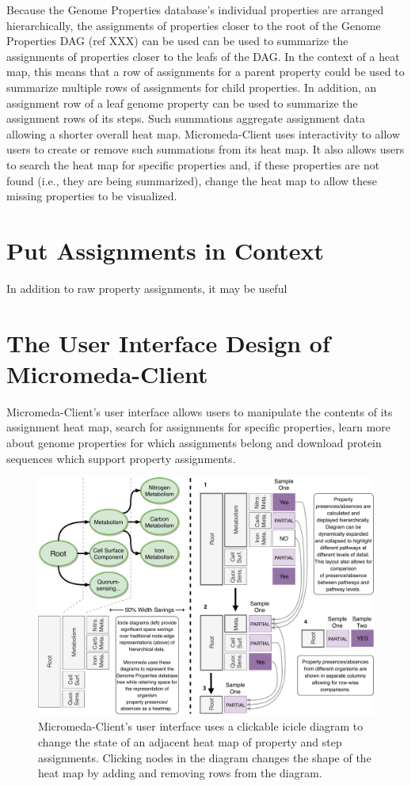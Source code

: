 Because the Genome Properties database's individual properties are arranged hierarchically, the assignments of properties closer to the root of the Genome Properties DAG (ref XXX) can be used can be used to summarize the assignments of properties closer to the leafs of the DAG. In the context of a heat map, this means that a row of assignments for a parent property could be used to summarize multiple rows of assignments for child properties. In addition, an assignment row of a leaf genome property can be used to summarize the assignment rows of its steps. Such summations aggregate assignment data allowing a shorter overall heat map. Micromeda-Client uses interactivity to allow users to create or remove such summations from its heat map. It also allows users to search the heat map for specific properties and, if these properties are not found (i.e., they are being summarized), change the heat map to allow these missing properties to be visualized.

\section{Put Assignments in Context}

In addition to raw property assignments, it may be useful 

\section{The User Interface Design of Micromeda-Client}

Micromeda-Client's user interface allows users to manipulate the contents of its assignment heat map, search for assignments for specific properties, learn more about genome properties for which assignments belong and download protein sequences which support property assignments. 

\begin{figure}[!ht]
  \centering
	\includegraphics[width=\textwidth]{media/visualization_design_philosphy.pdf}
	 \caption{Micromeda-Client's user interface uses a clickable icicle diagram to change the state of an adjacent heat map of property and step assignments. Clicking nodes in the diagram changes the shape of the heat map by adding and removing rows from the diagram.}
	 \label{fig:visualization-philosphy}
\end{figure}

